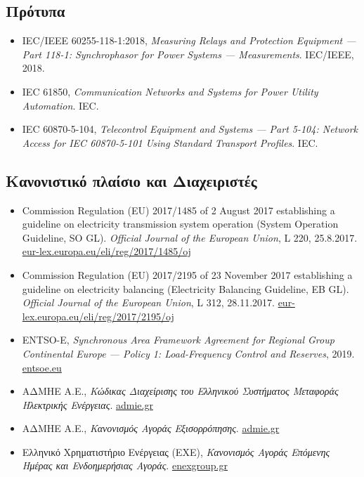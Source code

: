 \subsection*{Πρότυπα}

\begin{itemize}
\item IEC/IEEE 60255-118-1:2018, \textit{Measuring Relays and Protection Equipment ---
      Part 118-1: Synchrophasor for Power Systems --- Measurements}. IEC/IEEE, 2018.
\item IEC 61850, \textit{Communication Networks and Systems for Power Utility Automation}. IEC.
\item IEC 60870-5-104, \textit{Telecontrol Equipment and Systems --- Part 5-104: Network
      Access for IEC 60870-5-101 Using Standard Transport Profiles}. IEC.
\end{itemize}

\subsection*{Κανονιστικό πλαίσιο και Διαχειριστές}

\begin{itemize}
\item Commission Regulation (EU) 2017/1485 of 2 August 2017 establishing a guideline on
      electricity transmission system operation (System Operation Guideline, SO GL).
      \textit{Official Journal of the European Union}, L 220, 25.8.2017.
      \href{https://eur-lex.europa.eu/eli/reg/2017/1485/oj}{eur-lex.europa.eu/eli/reg/2017/1485/oj}
\item Commission Regulation (EU) 2017/2195 of 23 November 2017 establishing a guideline on
      electricity balancing (Electricity Balancing Guideline, EB GL). \textit{Official Journal
      of the European Union}, L 312, 28.11.2017.
      \href{https://eur-lex.europa.eu/eli/reg/2017/2195/oj}{eur-lex.europa.eu/eli/reg/2017/2195/oj}
\item ENTSO-E, \textit{Synchronous Area Framework Agreement for Regional Group Continental
      Europe --- Policy 1: Load-Frequency Control and Reserves}, 2019.
      \href{https://www.entsoe.eu/}{entsoe.eu}
\item ΑΔΜΗΕ Α.Ε., \textit{Κώδικας Διαχείρισης του Ελληνικού Συστήματος Μεταφοράς Ηλεκτρικής
      Ενέργειας}. \href{https://www.admie.gr/}{admie.gr}
\item ΑΔΜΗΕ Α.Ε., \textit{Κανονισμός Αγοράς Εξισορρόπησης}. \href{https://www.admie.gr/}{admie.gr}
\item Ελληνικό Χρηματιστήριο Ενέργειας (ΕΧΕ), \textit{Κανονισμός Αγοράς Επόμενης Ημέρας και
      Ενδοημερήσιας Αγοράς}. \href{https://www.enexgroup.gr/}{enexgroup.gr}
\end{itemize}

